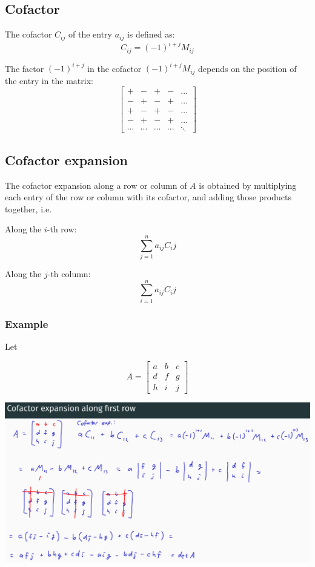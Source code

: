 \documentclass[11pt]{article}
\begin{document}
 \newpage
\subsection{Cofactor}
\label{sec:orgb8be7e0}
The cofactor \(C_{ij}\) of the entry \(a_{ij}\) is defined as:
\[C_{ij} = (-1)^{i + j} M_{ij}\]

The factor \((-1)^{i + j}\) in the cofactor \((-1)^{i + j} M_{ij}\) depends on the position
of the entry in the matrix:
\begin{displaymath}
\begin{bmatrix}
+ & - & + & - & \ldots \\
- & + & - & + & \ldots \\
+ & - & + & - & \ldots \\
- & + & - & + & \ldots \\
\cdots & \cdots & \cdots & \cdots & \ddots
\end{bmatrix}
\end{displaymath}
\subsection{Cofactor expansion}
\label{sec:orgd4cf79b}
The cofactor expansion along a row or column of \(A\) is obtained by multiplying each entry of the row or column with its cofactor, and adding those products together, i.e.


Along the \(i\)-th row:
\[\sum_{j = 1}^n a_{ij} C_ij\]

Along the \(j\)-th column:
\[\sum_{i = 1}^n a_{ij} C_ij\]

 \newpage
\subsubsection{Example}
\label{sec:org9fe3502}
Let

\begin{displaymath}
A = \begin{bmatrix}
a & b & c \\
d & f & g \\
h & i & j
\end{bmatrix}
\end{displaymath}

\begin{center}
\includegraphics[width=.9\linewidth]{./images/cofactor-expansion-along-the-first-row.png}
\end{center}
\end{document}
